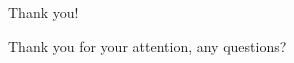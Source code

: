 \begin{frame}{Thank you!}
    
    \begin{center}
    Thank you for your attention, any questions?
    \end{center}
    
\end{frame}
